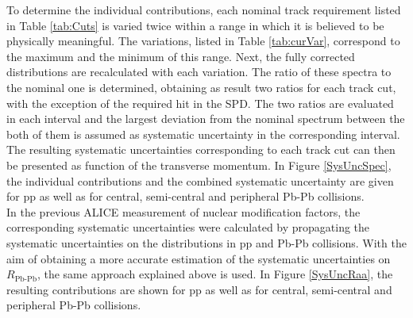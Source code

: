 \documentclass[12pt,a4paper]{report}
\begin{document}
To determine the individual contributions, each nominal track requirement listed in Table \ref{tab:Cuts} is varied twice within a range in which it is believed to be physically meaningful. The variations, listed in Table \ref{tab:curVar}, correspond to the maximum and the minimum of this range. Next, the fully corrected \pt distributions are recalculated with each variation. The ratio of these \pt spectra to the nominal one is determined, obtaining as result two ratios for each track cut, with the exception of the required hit in the SPD. The two ratios are evaluated in each \pt interval and the largest deviation from the nominal \pt spectrum between the both of them is assumed as systematic uncertainty in the corresponding \pt interval. The resulting systematic uncertainties corresponding to each track cut can then be presented as function of the transverse momentum. In Figure \ref{SysUncSpec}, the individual contributions and the combined systematic uncertainty are given for pp as well as for central, semi-central and peripheral Pb-Pb collisions. \\
In the previous ALICE measurement of nuclear modification factors, the corresponding systematic uncertainties were calculated by propagating the systematic uncertainties on the \pt distributions in pp and Pb-Pb collisions. With the aim of obtaining a more accurate estimation of the systematic uncertainties on $R_\text{Pb-Pb}$, the same approach explained above is used. In Figure \ref{SysUncRaa}, the resulting contributions are shown for pp as well as for central, semi-central and peripheral Pb-Pb collisions.
\end{document}
